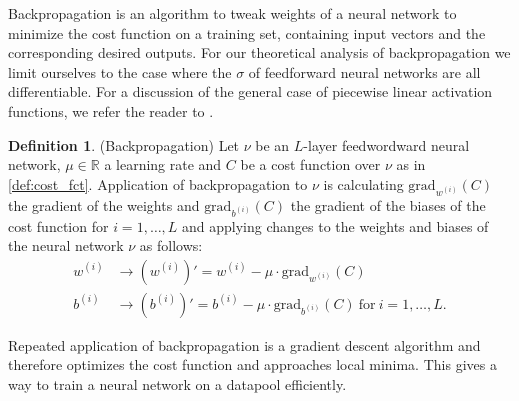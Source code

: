 \documentclass{article}
\theoremstyle{definition}
\newtheorem{definition}[theorem]{Definition}
\newtheorem{remark}[theorem]{Remark}
\begin{document}

Backpropagation is an algorithm to tweak weights of a neural network to minimize the cost function on a training set, containing input vectors and the corresponding desired outputs. For our theoretical analysis of backpropagation we limit ourselves to the case where the $\sigma$ of feedforward neural networks are all differentiable. For a discussion of the general case of piecewise linear activation functions, we refer the reader to \cite{agostinelli2014learning}.

\begin{definition}(Backpropagation)
Let $\nu$ be an $L$-layer feedwordward neural network, $\mu \in \mathbb{R}$ a learning rate and $C$ be a cost function over $\nu$ as in \ref{def:cost_fct}. Application of backpropagation to $\nu$ is calculating $\text{grad}_{w^{(i)}}(C)$ the gradient of the weights and $\text{grad}_{b^{(i)}}(C)$ the gradient of the biases of the cost function for $i = 1, \dots , L$ and applying changes to the weights and biases of the neural network $\nu$ as follows:
\begin{align*}
w^{(i)} &\to (w^{(i)})' = w^{(i)}-\mu \cdot \text{grad}_{w^{(i)}}(C) \\
b^{(i)} &\to (b^{(i)})' = b^{(i)}-\mu \cdot \text{grad}_{b^{(i)}}(C) \ \text{for} \ i = 1, \dots, L.
\end{align*}
\end{definition}

Repeated application of backpropagation is a gradient descent algorithm and therefore optimizes the cost function and approaches local minima. This gives a way to train a neural network on a datapool efficiently.
\end{document}
